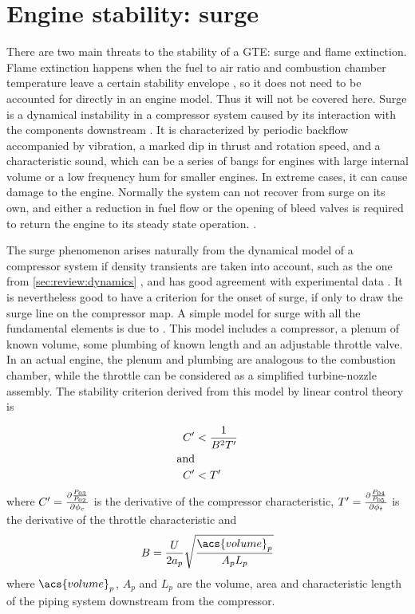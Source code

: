 \section{Engine stability: surge}
\label{sec:review:surge}

There are two main threats to the stability of a \ac{GTE}: surge and flame extinction.
Flame extinction happens when the fuel to air ratio and combustion chamber temperature 
leave a certain stability envelope \cite{Mattingly1996}, 
so it does not need to be accounted for directly in an engine model.
Thus it will not be covered here.
Surge is a dynamical instability in a compressor system caused by its interaction with the components downstream \cite{Sparks1983}. 
It is characterized by periodic backflow accompanied by vibration, a marked dip in thrust and rotation speed, and a characteristic sound, 
which can be a series of bangs for engines with large internal volume or a low frequency hum for smaller engines.
In extreme cases, it can cause damage to the engine. 
Normally the system can not recover from surge on its own, 
and either a reduction in fuel flow or the opening of bleed valves is required to return the engine to its steady state operation.
\cite{Willems1999}.

The surge phenomenon arises naturally from the dynamical model of a compressor system if density transients are taken into account, such as the one from \cref{sec:review:dynamics} \cite{Greitzer1976}, 
and has good agreement with experimental data \cite{Greitzer1976_2,Gravdahl2004}.
It is nevertheless good to have a criterion for the onset of surge, if only to draw the surge line on the compressor map.
A simple model for surge with all the fundamental elements is due to \textcite{Fink1988}. This model includes a compressor, a plenum of known volume, some plumbing of known length and an adjustable throttle valve. 
In an actual engine, the plenum and plumbing are analogous to the combustion chamber, while the throttle can be considered as a simplified turbine-nozzle assembly. 
The stability criterion derived from this model by linear control theory is

\begin{align}
    C' &< \frac{1}{B^2 T'} \label{eqn:surge2} \\
\text{and} \notag \\
    C' &< T' \label{eqn:surge1}
\end{align}
where $C' = \frac{\partial \frac{P_{03}}{P_{02}}}{\partial \phi_c}$ is the derivative of the compressor characteristic, $T' = \frac{\partial \frac{P_{04}}{P_{05}}}{\partial \phi_t}$ is the derivative of the throttle characteristic and 
\begin{equation}
    B = \frac{U}{2a_p}\sqrt{\frac{\acs{volume}_p}{A_p L_p}}
\end{equation}
where $\acs{volume}_p$, $A_p$ and $L_p$ are the volume, area and characteristic length of the piping system downstream from the compressor.

